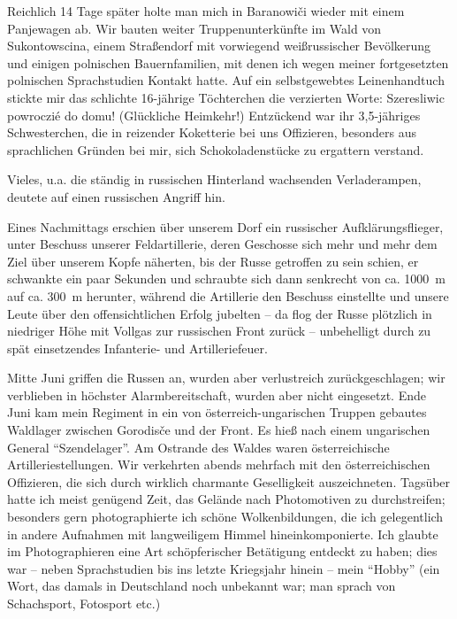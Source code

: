 \documentclass[a5paper,pagesize,10pt,twoside=true]{scrbook}
\begin{document}
Reichlich 14 Tage später holte man mich in Baranowiči wieder mit einem Panjewagen ab. Wir bauten weiter Truppenunterkünfte im Wald von Sukontowscina, einem Straßendorf mit vorwiegend weißrussischer Bevölkerung und einigen polnischen Bauernfamilien, mit denen ich wegen meiner fortgesetzten polnischen Sprachstudien Kontakt hatte. Auf ein selbstgewebtes Leinenhandtuch stickte mir das schlichte 16-jährige Töchterchen die verzierten Worte: Szeresliwic powroczié do domu! (Glückliche Heimkehr!) Entzückend war ihr 3,5-jähriges Schwesterchen, die in reizender Koketterie bei uns Offizieren, besonders aus sprachlichen Gründen bei mir, sich Schokoladenstücke zu ergattern verstand.

Vieles, u.a. die ständig in russischen Hinterland wachsenden Verladerampen, deutete auf einen russischen Angriff hin.

Eines Nachmittags erschien über unserem Dorf ein russischer Aufklärungsflieger, unter Beschuss unserer Feldartillerie, deren Geschosse sich mehr und mehr dem Ziel über unserem Kopfe näherten, bis der Russe getroffen zu sein schien, er schwankte ein paar Sekunden und schraubte sich dann senkrecht von ca. 1000~m auf ca. 300~m herunter, während die Artillerie den Beschuss einstellte und unsere Leute über den offensichtlichen Erfolg jubelten -- da flog der Russe plötzlich in niedriger Höhe mit Vollgas zur russischen Front zurück -- unbehelligt durch zu spät einsetzendes Infanterie- und Artilleriefeuer.

Mitte Juni griffen die Russen an, wurden aber verlustreich zurückgeschlagen; wir verblieben in höchster Alarmbereitschaft, wurden aber nicht eingesetzt. Ende Juni kam mein Regiment in ein von österreich-ungarischen Truppen gebautes Waldlager zwischen Gorodisče und der Front. Es hieß nach einem ungarischen General \enquote{Szendelager}. Am Ostrande des Waldes waren österreichische Artilleriestellungen. Wir verkehrten abends mehrfach mit den österreichischen Offizieren, die sich durch wirklich charmante Geselligkeit auszeichneten. Tagsüber hatte ich meist genügend Zeit, das Gelände nach Photomotiven zu durchstreifen; besonders gern photographierte ich schöne Wolkenbildungen, die ich gelegentlich in andere Aufnahmen mit langweiligem Himmel hineinkomponierte. Ich glaubte im Photographieren eine Art schöpferischer Betätigung entdeckt zu haben; dies war -- neben Sprachstudien bis ins letzte Kriegsjahr hinein -- mein \enquote{Hobby} (ein Wort, das damals in Deutschland noch unbekannt war; man sprach von Schachsport, Fotosport etc.)
\end{document}

